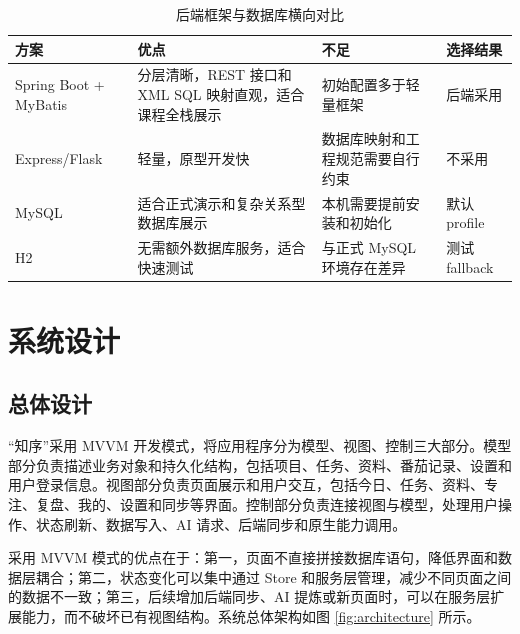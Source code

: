 \begin{table}[htbp]
\centering
\caption{后端框架与数据库横向对比}
\begin{tabularx}{\textwidth}{p{2.3cm}X X p{2.2cm}}
\toprule
方案 & 优点 & 不足 & 选择结果 \\
\midrule
Spring Boot + MyBatis & 分层清晰，REST 接口和 XML SQL 映射直观，适合课程全栈展示 & 初始配置多于轻量框架 & 后端采用 \\
Express/Flask & 轻量，原型开发快 & 数据库映射和工程规范需要自行约束 & 不采用 \\
MySQL & 适合正式演示和复杂关系型数据库展示 & 本机需要提前安装和初始化 & 默认 profile \\
H2 & 无需额外数据库服务，适合快速测试 & 与正式 MySQL 环境存在差异 & 测试 fallback \\
\bottomrule
\end{tabularx}
\end{table}

\chapter{系统设计}

\section{总体设计}

“知序”采用 MVVM 开发模式，将应用程序分为模型、视图、控制三大部分。模型部分负责描述业务对象和持久化结构，包括项目、任务、资料、番茄记录、设置和用户登录信息。视图部分负责页面展示和用户交互，包括今日、任务、资料、专注、复盘、我的、设置和同步等界面。控制部分负责连接视图与模型，处理用户操作、状态刷新、数据写入、AI 请求、后端同步和原生能力调用。

采用 MVVM 模式的优点在于：第一，页面不直接拼接数据库语句，降低界面和数据层耦合；第二，状态变化可以集中通过 Store 和服务层管理，减少不同页面之间的数据不一致；第三，后续增加后端同步、AI 提炼或新页面时，可以在服务层扩展能力，而不破坏已有视图结构。系统总体架构如图 \ref{fig:architecture} 所示。

